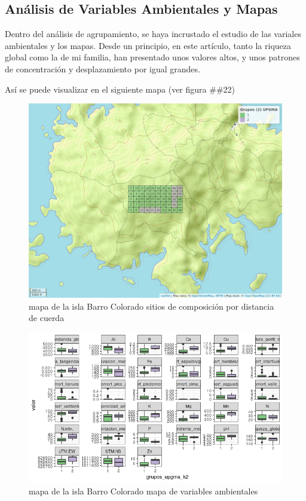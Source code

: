 \documentclass[11pt,]{article}
\begin{document}
\subsection{Análisis de Variables Ambientales y
Mapas}\label{anuxe1lisis-de-variables-ambientales-y-mapas}

Dentro del análisis de agrupamiento, se haya incrustado el estudio de
las variales ambientales y los mapas. Desde un principio, en este
artículo, tanto la riqueza global como la de mi familia, han presentado
unos valores altos, y unos patrones de concentración y desplazamiento
por igual grandes.

Así se puede visualizar en el siguiente mapa (ver figura \#\#22)

\begin{figure}
\centering
\includegraphics[width=1.00000\textwidth]{mapa_upgma_k2.png}
\caption{mapa de la isla Barro Colorado sitios de composición por
distancia de cuerda \label{fig:bci_map}}
\end{figure}

\begin{figure}
\centering
\includegraphics[width=1.00000\textwidth]{mapas_variables_ambientales.png}
\caption{mapa de la isla Barro Colorado mapa de variables ambientales
\label{fig:bci_map}}
\end{figure}
\end{document}
